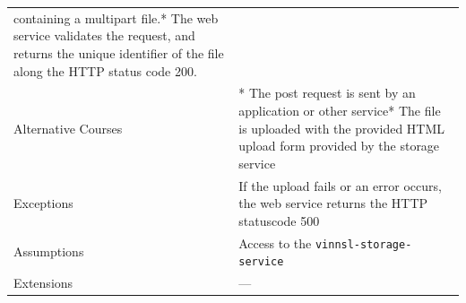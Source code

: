 \begin{longtable}[]{@{}ll@{}}
\begin{minipage}[t]{0.68\columnwidth}
containing a multipart file.* The web service validates the request, and
returns the unique identifier of the file along the HTTP status code
200.\strut
\end{minipage}\tabularnewline
\begin{minipage}[t]{0.27\columnwidth}\raggedright\strut
Alternative Courses\strut
\end{minipage} & \begin{minipage}[t]{0.68\columnwidth}\raggedright\strut
* The post request is sent by an application or other service* The file
is uploaded with the provided HTML upload form provided by the storage
service\strut
\end{minipage}\tabularnewline
\begin{minipage}[t]{0.27\columnwidth}\raggedright\strut
Exceptions\strut
\end{minipage} & \begin{minipage}[t]{0.68\columnwidth}\raggedright\strut
If the upload fails or an error occurs, the web service returns the HTTP
statuscode 500\strut
\end{minipage}\tabularnewline
\begin{minipage}[t]{0.27\columnwidth}\raggedright\strut
Assumptions\strut
\end{minipage} & \begin{minipage}[t]{0.68\columnwidth}\raggedright\strut
Access to the \texttt{vinnsl-storage-service}\strut
\end{minipage}\tabularnewline
\begin{minipage}[t]{0.27\columnwidth}\raggedright\strut
Extensions\strut
\end{minipage} & \begin{minipage}[t]{0.68\columnwidth}\raggedright\strut
---\strut
\end{minipage}\tabularnewline
\bottomrule
\end{longtable}

